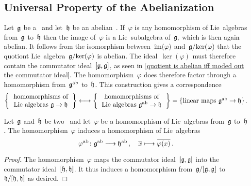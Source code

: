 \subsection{Universal Property of the Abelianization}


\begin{example}
	\label{universal property of abelianization}
	Let~$\mathfrak{g}$ be a~\liealgebra{$\kf$} and let~$\mathfrak{h}$ be an abelian~\liealgebra{$\kf$}.
	If~$\varphi$ is any homomorphism of Lie~algebras from~$\mathfrak{g}$ to~$\mathfrak{h}$ then the image of~$\varphi$ is a Lie~subalgebra of~$\mathfrak{g}$, which is then again abelian.
	It follows from the isomorphism between~$\operatorname{im}(\varphi)$ and~$\mathfrak{g} / {\ker(\varphi)}$ that the quotiont Lie~algebra~$\mathfrak{g} / {\ker(\varphi)}$ is abelian.
	The ideal~$\ker(\varphi)$ must therefore contain the commutator ideal~$[\mathfrak{g}, \mathfrak{g}]$, as seen in \cref{quotient is abelian iff moded out the commutator ideal}.
	The homomorphism~$\varphi$ does therefore factor through a homomorphism from~$\mathfrak{g}^{\mathrm{ab}}$ to~$\mathfrak{h}$.
	This construction gives a {\onetoonetext} correspondence
	\[
		\left\{
			\begin{tabular}{c}
				homomorphisms of \\
				Lie~algebras~$\glie \to \hlie$
			\end{tabular}
		\right\}
		\onetoone
		\left\{
			\begin{tabular}{c}
				homomorphisms of \\
				Lie~algebras $\glie^{\ab} \to \hlie$
			\end{tabular}
		\right\}
		=
		\{
			\textstyle
			\text{linear maps~$\glie^{\ab} \to \hlie$}
		\} \,.
	\]
\end{example}


\begin{proposition}
	\label{functoriality of abelianization}
	Let~$\mathfrak{g}$ and~$\mathfrak{h}$ be two~\liealgebras{$\kf$} and let~$\varphi$ be a homomorphism of Lie~algebras from~$\mathfrak{g}$ to~$\mathfrak{h}$.
	The homomorphism~$\varphi$ induces a homomorphism of Lie~algebras
	\[
		\varphi^{\ab}
		\colon
		\glie^{\ab}
		\to
		\hlie^{\ab} \,,
		\quad
		\class{x}
		\mapsto
		\class{\varphi(x)} \,.
	\]
\end{proposition}


\begin{proof}
	The homomorphism~$\varphi$ maps the commutator ideal~$[\mathfrak{g}, \mathfrak{g}]$ into the commutator ideal~$[\mathfrak{h}, \mathfrak{h}]$.
	It thus induces a homomorphism from~$\mathfrak{g} / [\mathfrak{g}, \mathfrak{g}]$ to~$\mathfrak{h} / [\mathfrak{h}, \mathfrak{h}]$ as desired.
\end{proof}



